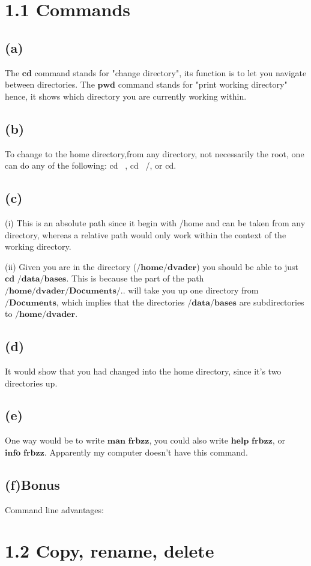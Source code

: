 \section*{1.1 Commands}

\subsection*{(a)}

The $\textbf{cd}$ command stands for "change directory", its function is to let you navigate between directories. The $\textbf{pwd}$ command stands for "print working directory" hence, it shows which directory you are currently working within.
\subsection*{(b)}
To change to the home directory,from any directory, not necessarily the root, one can do any of the following: cd ~, cd ~/, or cd.
\subsection*{(c)}
(i) This is an absolute path since it begin with /home and can be taken from any directory, whereas a relative path would only work within the context of the working directory.

(ii) Given you are in the directory ($\textbf{/home/dvader}$) you should be able to just $\textbf{cd /data/bases}$. This is because the part of the path $\textbf{/home/dvader/Documents/..}$ will take you up one directory from $\textbf{/Documents}$, which implies that the directories $\textbf{/data/bases}$ are subdirectories to $\textbf{/home/dvader}$.
\subsection*{(d)}
It would show that you had changed into the home directory, since it's two directories up.
\subsection*{(e)}
One way would be to write $\textbf{man frbzz}$, you could also write $\textbf{help frbzz}$, or $\textbf{info frbzz}$. Apparently my computer doesn't have this command.
\subsection*{(f)Bonus}
Command line advantages:
\section*{1.2 Copy, rename, delete}

